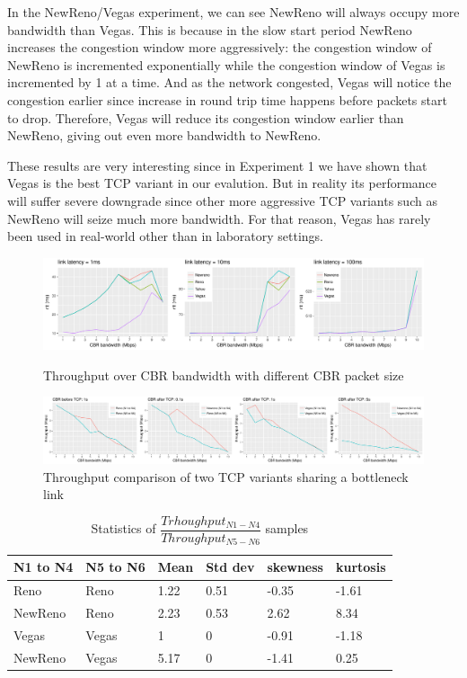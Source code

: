 \documentclass[USenglish,oneside,twocolumn]{article}
\begin{document}
In the NewReno/Vegas experiment, we can see NewReno will always occupy more bandwidth than Vegas. This is because in the slow start period NewReno increases the congestion window more aggressively: the congestion window of NewReno is incremented exponentially while the congestion window of Vegas is incremented by 1 at a time. And as the network congested, Vegas will notice the congestion earlier since increase in round trip time happens before packets start to drop. Therefore, Vegas will reduce its congestion window earlier than NewReno, giving out even more bandwidth to NewReno.

These results are very interesting since in Experiment 1 we have shown that Vegas is the best TCP variant in our evalution. But in reality its performance will suffer severe downgrade since other more aggressive TCP variants such as NewReno will seize much more bandwidth. For that reason, Vegas has rarely been used in real-world other than in laboratory settings.

\begin{figure}
	\includegraphics[width=\linewidth]{fig/experiment1/rtt.pdf}
	\captionsetup{justification=centering}
	\caption{Throughput over CBR bandwidth with different CBR packet size}
	
	
	\includegraphics[width=\linewidth]{fig/experiment2/throughput.pdf}
	\captionsetup{justification=centering}
	\caption{Throughput comparison of two TCP variants sharing a bottleneck link}
	\label{throughput fairness}
\end{figure}


\begin{table}
	\begin{tabular}{| l | l | l | l | l | l |}
		N1 to N4 & N5 to N6 & Mean & Std dev & skewness & kurtosis \\ \hline
		Reno & Reno & 1.22 & 0.51 & -0.35 & -1.61 \\ \hline
		NewReno & Reno & 2.23 & 0.53 & 2.62 & 8.34 \\ \hline
		Vegas & Vegas & 1 & 0 & -0.91 & -1.18 \\ \hline
		NewReno & Vegas & 5.17 & 0 & -1.41 & 0.25 \\ 
	\end{tabular}
	\captionsetup{justification=centering}
	\caption{Statistics of \(\dfrac{Trhoughput_{N1-N4}}{Throughput_{N5-N6}}\) samples}
	\label{Throughput statistics}
\end{table}
\end{document}
